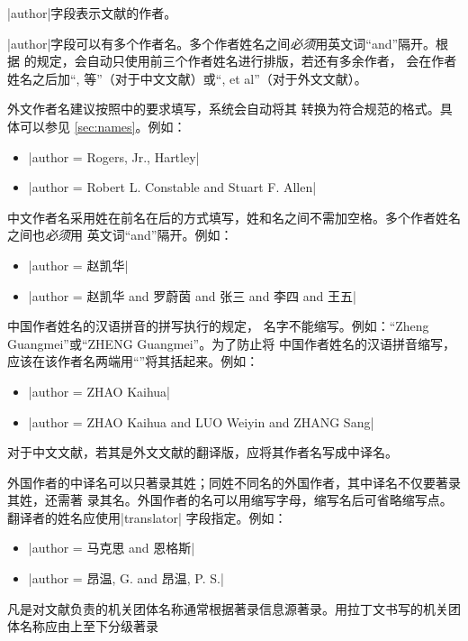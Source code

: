 |author|字段表示文献的作者。

|author|字段可以有多个作者名。多个作者姓名之间\emph{必须}用英文词``and''隔开。根据
\cite{gbt7714-2005}的规定，{\BibTeX}会自动只使用前三个作者姓名进行排版，若还有多余作者，
会在作者姓名之后加``, 等''（对于中文文献）或``, et al''（对于外文文献）。

外文作者名建议按照\cite[157]{lamport1994latex}中的要求填写，{\BibTeX}系统会自动将其
转换为符合规范\cite{gbt7714-2005}的格式。具体可以参见
\ref{sec:names}。例如：
\begin{itemize}
\item |author = {Rogers, Jr., Hartley}|
\item |author = {Robert L. Constable and Stuart F. Allen}|
\end{itemize}

中文作者名采用姓在前名在后的方式填写，姓和名之间不需加空格。多个作者姓名之间也\emph{必须}用
英文词``and''隔开。例如：
\begin{itemize}
\item |author = {赵凯华}|
\item |author = {赵凯华 and 罗蔚茵 and 张三 and 李四 and 王五}|
\end{itemize}

中国作者姓名的汉语拼音的拼写执行的规定\cite{gbt16159-2012}，
名字不能缩写。例如：``Zheng Guangmei''或``ZHENG Guangmei''。为了防止{\BibTeX}将
中国作者姓名的汉语拼音缩写，应该在该作者名两端用``{}''将其括起来。例如：
\begin{itemize}
\item |author = {{ZHAO Kaihua}}|
\item |author = {{ZHAO Kaihua} and {LUO Weiyin} and {ZHANG Sang}}|
\end{itemize}

对于中文文献，若其是外文文献的翻译版，应将其作者名写成中译名。

外国作者的中译名可以只著录其姓；同姓不同名的外国作者，其中译名不仅要著录其姓，还需著
录其名。外国作者的名可以用缩写字母，缩写名后可省略缩写点。翻译者的姓名应使用|translator|
字段指定。例如：
\begin{itemize}
\item |author = {马克思 and 恩格斯}|
\item |author = {昂温, G. and 昂温, P. S.}|
\end{itemize}

凡是对文献负责的机关团体名称通常根据著录信息源著录。用拉丁文书写的机关团体名称应由上至下分级著录 

